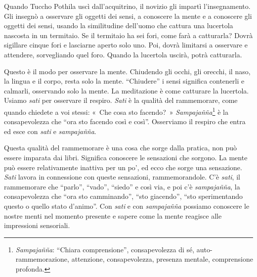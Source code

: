 Quando Tuccho Pothila uscì dall'acquitrino, il novizio gli impartì
l'insegnamento. Gli insegnò a osservare gli oggetti dei sensi, a
conoscere la mente e a conoscere gli oggetti dei sensi, usando la
similitudine dell'uomo che cattura una lucertola nascosta in un
termitaio. Se il termitaio ha sei fori, come farà a catturarla? Dovrà
sigillare cinque fori e lasciarne aperto solo uno. Poi, dovrà limitarsi
a osservare e attendere, sorvegliando quel foro. Quando la lucertola
uscirà, potrà catturarla.

Questo è il modo per osservare la mente. Chiudendo gli occhi, gli
orecchi, il naso, la lingua e il corpo, resta solo la mente.
``Chiudere'' i sensi significa contenerli e calmarli, osservando solo la
mente. La meditazione è come catturare la lucertola. Usiamo \emph{sati}
per osservare il respiro. \emph{Sati} è la qualità del rammemorare, come
quando chiedete a voi stessi: «~Che cosa sto facendo?~»
\emph{Sampajañña}\footnote{\emph{Sampajañña}: ``Chiara comprensione'',
  consapevolezza di sé, auto-rammemorazione, attenzione, consapevolezza,
  presenza mentale, comprensione profonda.} è la consapevolezza che
``ora sto facendo così e così''. Osserviamo il respiro che entra ed esce
con \emph{sati} e \emph{sampajañña}.

Questa qualità del rammemorare è una cosa che sorge dalla pratica, non
può essere imparata dai libri. Significa conoscere le sensazioni che
sorgono. La mente può essere relativamente inattiva per un po', ed ecco
che sorge una sensazione. \emph{Sati} lavora in connessione con queste
sensazioni, rammemorandole. C'è \emph{sati}, il rammemorare che
``parlo'', ``vado'', ``siedo'' e così via, e poi c'è \emph{sampajañña},
la consapevolezza che ``ora sto camminando'', ``sto giacendo'', ``sto
sperimentando questo o quello stato d'animo''. Con \emph{sati} e con
\emph{sampajañña} possiamo conoscere le nostre menti nel momento
presente e sapere come la mente reagisce alle impressioni sensoriali.

